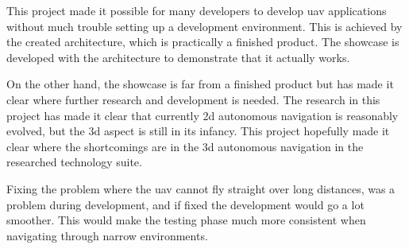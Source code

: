This project made it possible for many developers to develop \acs{uav} applications without much trouble setting up a development environment. This is achieved by the created architecture, which is practically a finished product. The showcase is developed with the architecture to demonstrate that it actually works.

On the other hand, the showcase is far from a finished product but has made it clear where further research and development is needed. The research in this project has made it clear that currently \acs{2d} autonomous navigation is reasonably evolved, but the \acs{3d} aspect is still in its infancy. This project hopefully made it clear where the shortcomings are in the \acs{3d} autonomous navigation in the researched technology suite.

Fixing the problem where the \acs{uav} cannot fly straight over long distances, was a problem during development, and if fixed the development would go a lot smoother. This would make the testing phase much more consistent when navigating through narrow environments.